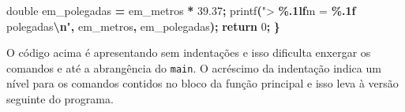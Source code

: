 \documentclass[
  11pt,
  a4paper,
]{scrbook}
\newenvironment{Shaded}{\begin{snugshade}}{\end{snugshade}}
\newcommand{\ControlFlowTok}[1]{\textcolor[rgb]{0.13,0.29,0.53}{\textbf{#1}}}
\newcommand{\DataTypeTok}[1]{\textcolor[rgb]{0.13,0.29,0.53}{#1}}
\newcommand{\DecValTok}[1]{\textcolor[rgb]{0.00,0.00,0.81}{#1}}
\newcommand{\FloatTok}[1]{\textcolor[rgb]{0.00,0.00,0.81}{#1}}
\newcommand{\NormalTok}[1]{#1}
\newcommand{\OperatorTok}[1]{\textcolor[rgb]{0.81,0.36,0.00}{\textbf{#1}}}
\newcommand{\SpecialCharTok}[1]{\textcolor[rgb]{0.81,0.36,0.00}{\textbf{#1}}}
\newcommand{\StringTok}[1]{\textcolor[rgb]{0.31,0.60,0.02}{#1}}
\begin{document}
\begin{Shaded}
\begin{Highlighting}[]
\DataTypeTok{double}\NormalTok{ em\_polegadas }\OperatorTok{=}\NormalTok{ em\_metros }\OperatorTok{*} \FloatTok{39.37}\OperatorTok{;}
\NormalTok{printf}\OperatorTok{(}\StringTok{"\textgreater{} }\SpecialCharTok{\%.1lf}\StringTok{m = }\SpecialCharTok{\%.1f}\StringTok{ polegadas}\SpecialCharTok{\textbackslash{}n}\StringTok{"}\OperatorTok{,}\NormalTok{ em\_metros}\OperatorTok{,}\NormalTok{ em\_polegadas}\OperatorTok{);}
\ControlFlowTok{return} \DecValTok{0}\OperatorTok{;}
\OperatorTok{\}}
\end{Highlighting}
\end{Shaded}

O código acima é apresentando sem indentações e isso dificulta enxergar
os comandos e até a abrangência do \texttt{main}. O acréscimo da
indentação indica um nível para os comandos contidos no bloco da função
principal e isso leva à versão seguinte do programa.
\end{document}
